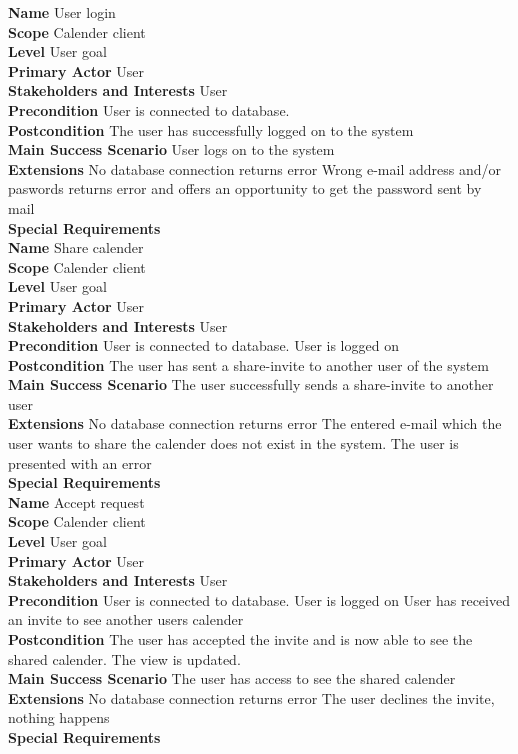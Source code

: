 \documentclass[a4paper,10pt,titlepage]{article}
\begin{document}
	\textbf{Name}
	User login
	\\
	\textbf{Scope}
	Calender client
	\\
	\textbf{Level}
	User goal
	\\
	\textbf{Primary Actor}
	User
	\\
	\textbf{Stakeholders and Interests}
	User
	\\
	\textbf{Precondition}
	User is connected to database.
	\\
	\textbf{Postcondition}
	The user has successfully logged on to the system
	\\
	\textbf{Main Success Scenario}
	User logs on to the system
	\\
	\textbf{Extensions}
	No database connection returns error
	Wrong e-mail address and/or paswords returns error and offers an opportunity to get the password sent by mail
	\\
	\textbf{Special Requirements}
	\\
	
	\textbf{Name}
	Share calender
	\\
	\textbf{Scope}
	Calender client
	\\
	\textbf{Level}
	User goal
	\\
	\textbf{Primary Actor}
	User
	\\
	\textbf{Stakeholders and Interests}
	User
	\\
	\textbf{Precondition}
	User is connected to database.
	User is logged on
	\\
	\textbf{Postcondition}
	The user has sent a share-invite to another user of the system
	\\
	\textbf{Main Success Scenario}
	The user successfully sends a share-invite to another user
	\\
	\textbf{Extensions}
	No database connection returns error
	The entered e-mail which the user wants to share the calender does not exist in the system. The user is presented with an error
	\\
	\textbf{Special Requirements}
	\\
	
	\textbf{Name}
	Accept request
	\\
	\textbf{Scope}
	Calender client
	\\
	\textbf{Level}
	User goal
	\\
	\textbf{Primary Actor}
	User
	\\
	\textbf{Stakeholders and Interests}
	User
	\\
	\textbf{Precondition}
	User is connected to database.
	User is logged on
	User has received an invite to see another users calender
	\\
	\textbf{Postcondition}
	The user has accepted the invite and is now able to see the shared calender. The view is updated.
	\\
	\textbf{Main Success Scenario}
	The user has access to see the shared calender
	\\
	\textbf{Extensions}
	No database connection returns error
	The user declines the invite, nothing happens
	\\
	\textbf{Special Requirements}
	
\end{document}
